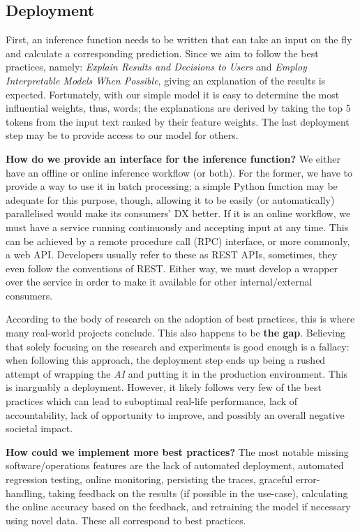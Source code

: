 \subsection{Deployment}

First, an inference function needs to be written that can take an input on the fly and calculate a corresponding prediction. Since we aim to follow the best practices, namely: \textit{Explain Results and Decisions to Users} and \textit{Employ Interpretable Models When Possible}, giving an explanation of the results is expected. Fortunately, with our simple model it is easy to determine the most influential weights, thus, words; the explanations are derived by taking the top 5 tokens from the input text ranked by their feature weights. The last deployment step may be to provide access to our model for others.

\begin{displayquote}
\textbf{How do we provide an interface for the inference function?} We either have an offline or online inference workflow (or both). For the former, we have to provide a way to use it in batch processing; a simple Python function may be adequate for this purpose, though, allowing it to be easily (or automatically) parallelised would make its consumers' DX better. If it is an online workflow, we must have a service running continuously and accepting input at any time. This can be achieved by a remote procedure call (RPC) interface, or more commonly, a web API. Developers usually refer to these as REST APIs, sometimes, they even follow the conventions of REST. Either way, we must develop a wrapper over the service in order to make it available for other internal/external consumers.
\end{displayquote}

According to the body of research on the adoption of best practices, this is where many real-world projects conclude. This also happens to be \textbf{the gap}. Believing that solely focusing on the research and experiments is good enough is a fallacy: when following this approach, the deployment step ends up being a rushed attempt of wrapping the \textit{AI} and putting it in the production environment. This is inarguably a deployment. However, it likely follows very few of the best practices which can lead to suboptimal real-life performance, lack of accountability, lack of opportunity to improve, and possibly an overall negative societal impact.

\begin{displayquote}
\textbf{How could we implement more best practices?} The most notable missing software/operations features are the lack of automated deployment, automated regression testing, online monitoring, persisting the traces, graceful error-handling, taking feedback on the results (if possible in the use-case), calculating the online accuracy based on the feedback, and retraining the model if necessary using novel data. These all correspond to best practices.
\end{displayquote}

